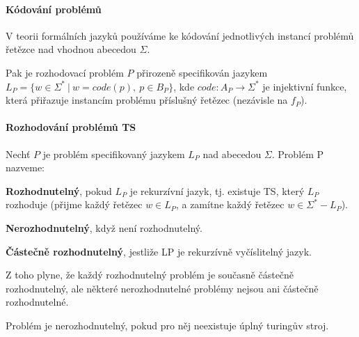 \paragraph*{Kódování problémů}

\begin{compactitem}
    \item V teorii formálních jazyků používáme ke kódování jednotlivých instancí problémů řetězce nad vhodnou abecedou $\Sigma$.

    \item Pak je rozhodovací problém $P$ přirozeně specifikován
    jazykem $L_P = \{ w \in \Sigma^* ~|~ w = code(p),~ p \in B_P \}$, kde $code: A_P \rightarrow \Sigma^*$ je injektivní funkce, která přiřazuje instancím problému příslušný řetězec (nezávisle na $f_P$).
\end{compactitem}

\paragraph*{Rozhodování problémů TS}

\begin{compactitem}
    \item Nechť $P$ je problém specifikovaný jazykem $L_P$ nad abecedou $\Sigma$. Problém P nazveme: \begin{compactitem}

        \item \textbf{Rozhodnutelný}, pokud $L_P$ je rekurzívní jazyk, tj. existuje TS, který $L_P$ rozhoduje (přijme každý řetězec $w \in L_P$, a zamítne každý řetězec $w \in \Sigma^* - L_P $).

        \item \textbf{Nerozhodnutelný}, když není rozhodnutelný.

        \item \textbf{Částečně rozhodnutelný}, jestliže LP je rekurzívně vyčíslitelný jazyk.

    \end{compactitem}

    \item Z toho plyne, že každý rozhodnutelný problém je současně částečně rozhodnutelný, ale některé nerozhodnutelné problémy nejsou ani částečně rozhodnutelné. \begin{compactitem}
        \item Problém je nerozhodnutelný, pokud pro něj neexistuje úplný turingův stroj.
    \end{compactitem}
\end{compactitem}

